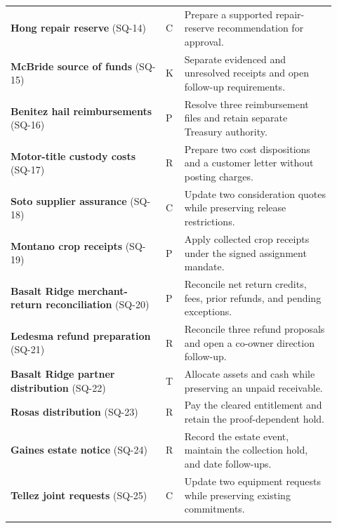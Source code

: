 \documentclass[11pt,letterpaper]{article}
\begin{document}
\begin{longtable}{@{}p{0.44\linewidth}p{0.05\linewidth}p{0.43\linewidth}@{}}
\textbf{Hong repair reserve} (SQ-14) & C & Prepare a supported repair-reserve recommendation for approval.\\\addlinespace
\textbf{McBride source of funds} (SQ-15) & K & Separate evidenced and unresolved receipts and open follow-up requirements.\\\addlinespace
\textbf{Benitez hail reimbursements} (SQ-16) & P & Resolve three reimbursement files and retain separate Treasury authority.\\\addlinespace
\textbf{Motor-title custody costs} (SQ-17) & R & Prepare two cost dispositions and a customer letter without posting charges.\\\addlinespace
\textbf{Soto supplier assurance} (SQ-18) & C & Update two consideration quotes while preserving release restrictions.\\\addlinespace
\textbf{Montano crop receipts} (SQ-19) & P & Apply collected crop receipts under the signed assignment mandate.\\\addlinespace
\textbf{Basalt Ridge merchant-return reconciliation} (SQ-20) & P & Reconcile net return credits, fees, prior refunds, and pending exceptions.\\\addlinespace
\textbf{Ledesma refund preparation} (SQ-21) & R & Reconcile three refund proposals and open a co-owner direction follow-up.\\\addlinespace
\textbf{Basalt Ridge partner distribution} (SQ-22) & T & Allocate assets and cash while preserving an unpaid receivable.\\\addlinespace
\textbf{Rosas distribution} (SQ-23) & R & Pay the cleared entitlement and retain the proof-dependent hold.\\\addlinespace
\textbf{Gaines estate notice} (SQ-24) & R & Record the estate event, maintain the collection hold, and date follow-ups.\\\addlinespace
\textbf{Tellez joint requests} (SQ-25) & C & Update two equipment requests while preserving existing commitments.\\\addlinespace
\bottomrule\end{longtable}
\end{document}
